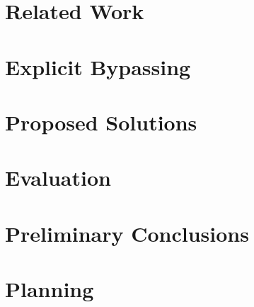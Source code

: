 \documentclass[a4paper,10pt,twoside]{report}
\begin{document}

%


%


\chapter{Related Work}\label{chapter:related_work}



\chapter{Explicit Bypassing}\label{chapter:explicit_bypassing}



\chapter{Proposed Solutions}\label{chapter:solutions}



\chapter{Evaluation}\label{chapter:evaluation}



\chapter{Preliminary Conclusions}\label{chapter:conclusions}



\chapter{Planning}\label{chapter:planning}
				

\clearemptydoublepage


%


\clearemptydoublepage

\appendix
{}


\end{document}

